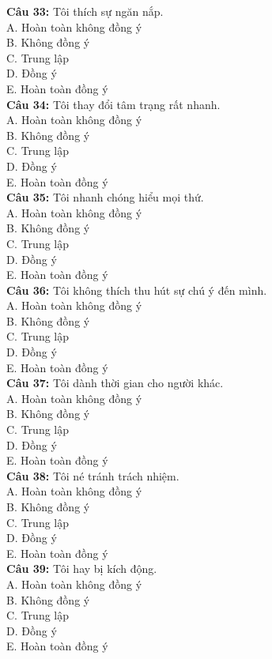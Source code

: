 \begin{multicols}{2}
\textbf{Câu 33:} Tôi thích sự ngăn nắp. \\
A. Hoàn toàn không đồng ý \\
B. Không đồng ý \\
C. Trung lập \\
D. Đồng ý \\
E. Hoàn toàn đồng ý \\

\textbf{Câu 34:} Tôi thay đổi tâm trạng rất nhanh. \\
A. Hoàn toàn không đồng ý \\
B. Không đồng ý \\
C. Trung lập \\
D. Đồng ý \\
E. Hoàn toàn đồng ý \\

\textbf{Câu 35:} Tôi nhanh chóng hiểu mọi thứ. \\
A. Hoàn toàn không đồng ý \\
B. Không đồng ý \\
C. Trung lập \\
D. Đồng ý \\
E. Hoàn toàn đồng ý \\

\textbf{Câu 36:} Tôi không thích thu hút sự chú ý đến mình. \\
A. Hoàn toàn không đồng ý \\
B. Không đồng ý \\
C. Trung lập \\
D. Đồng ý \\
E. Hoàn toàn đồng ý \\

\textbf{Câu 37:} Tôi dành thời gian cho người khác. \\
A. Hoàn toàn không đồng ý \\
B. Không đồng ý \\
C. Trung lập \\
D. Đồng ý \\
E. Hoàn toàn đồng ý \\

\textbf{Câu 38:} Tôi né tránh trách nhiệm. \\
A. Hoàn toàn không đồng ý \\
B. Không đồng ý \\
C. Trung lập \\
D. Đồng ý \\
E. Hoàn toàn đồng ý \\

\textbf{Câu 39:} Tôi hay bị kích động. \\
A. Hoàn toàn không đồng ý \\
B. Không đồng ý \\
C. Trung lập \\
D. Đồng ý \\
E. Hoàn toàn đồng ý \\


\end{multicols}
